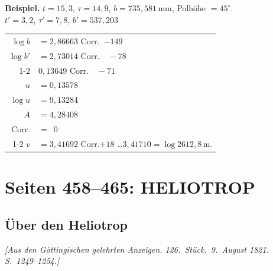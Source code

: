 \documentclass[12pt,a4paper]{article}
\theoremstyle{plain}
\theoremstyle{definition}
\theoremstyle{remark}
\begin{document}
\medskip
\noindent
\textbf{Beispiel.} $t = 15{,}3$, $\tau = 14{,}9$, $b = 735{,}581\,\text{mm}$, Polh\"ohe $= 45^{\circ}$.\\
$t' = 3{,}2$, $\tau' = 7{,}8$, $b' = 537{,}203$

\medskip
\noindent
\begin{tabular}{r@{\ }l}
$\log b$ & $= 2{,}86663$ \quad Corr.\ $-149$ \\
$\log b'$ & $= 2{,}73014$ \quad Corr.\ $\phantom{0}-78$ \\
\cline{1-2}
& $0{,}13649$ \quad Corr.\ $\phantom{0}-71$ \\
$u$ & $= 0{,}13578$ \\
$\log u$ & $= 9{,}13284$ \\
$A$ & $= 4{,}28408$ \\
Corr. & $= \phantom{0}0$ \\
\cline{1-2}
$v$ & $= 3{,}41692$ \quad Corr.$+18$ \ldots $3{,}41710 = \log 2612{,}8\,\text{m}$.
\end{tabular}

\vfill
\eject


\section*{Seiten 458--465: HELIOTROP}
\label{sec:heliotrop}

\subsection*{\"Uber den Heliotrop}

\noindent
\textit{[Aus den G\"ottingischen gelehrten Anzeigen. 126.\ St\"uck.\ 9.\ August 1821. S.~1249--1254.]}

\medskip
\end{document}
